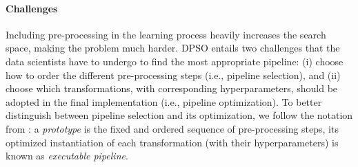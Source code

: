 \paragraph{Challenges} Including pre-processing in the learning process heavily increases the search space, making the problem much harder.
DPSO entails two challenges that the data scientists have to undergo to find the most appropriate pipeline: (i) choose how to order the different pre-processing steps  (i.e., pipeline selection), and (ii) choose which transformations, with corresponding hyperparameters, should be adopted in the final implementation  (i.e., pipeline optimization).
To better distinguish between pipeline selection and its optimization, we follow the notation from \cite{Quemy20InfSystems}: a \textit{prototype} is the fixed and ordered sequence of pre-processing steps, its optimized instantiation of each transformation (with their hyperparameters) is known as \textit{executable pipeline}.


